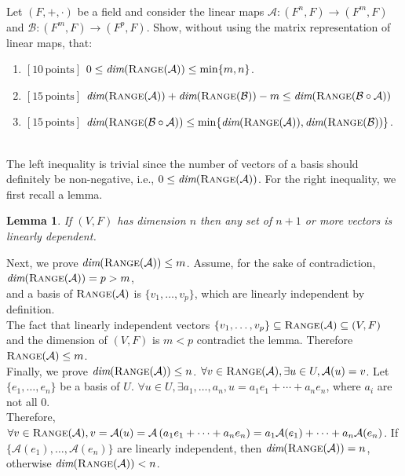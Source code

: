 \documentclass[a4paper,10.5pt]{article}
\def\dim{{\mbox{\em dim}}}
\def\range{{\mbox{\sc Range}}}
\newtheorem{lemma}{Lemma}
\newcommand{\A}{\mathcal{A}}
\begin{document}
\clearpage

\\
Let $(F, +, \cdot)$ be a field and consider the linear maps $\mathcal{A} : (F^n, F) \rightarrow (F^m, F)$ and  $\mathcal{B} : (F^m, F) \rightarrow (F^p, F)$. Show, without using the matrix representation of linear maps, that:

\begin{enumerate}
	\item {\bf$[10\, \text{points}]$} $0 \leq \dim(\range(\mathcal{A})) \leq \min\{m, n\}$.
	\item {\bf$[15\, \text{points}]$} $\dim(\range(\mathcal{A})) + \dim(\range(\mathcal{B})) - m \leq \dim(\range(\mathcal{B}\circ\mathcal{A}))$
	\item {\bf$[15\, \text{points}]$} $\dim(\range(\mathcal{B}\circ\mathcal{A})) \leq \min\{\dim(\range(\mathcal{A})),\dim(\range(\mathcal{B}))\}$. 
\end{enumerate}


 \\
The left inequality is trivial since the number of vectors of a basis should definitely be non-negative, i.e., $0 \leq \dim(\range(\mathcal{A}))$. For the right inequality, we first recall a lemma.
\begin{lemma}
	If $(V,F)$ has dimension $n$ then any set of $n+1$ or more vectors is linearly dependent.
\end{lemma}
Next, we prove $\dim(\range(\A)) \leq m$. Assume, for the sake of contradiction, $\dim(\range(\A)) = p > m$, \\
and a basis of $\range(\A)$ is $\{v_1,\dots,v_p\}$, which are linearly independent by definition. \\
The fact that linearly independent vectors $\{v_1,\dots,v_p\} \subseteq \range(\A) \subseteq (V,F)$ and the dimension of $(V,F)$ is $m<p$ contradict the lemma. Therefore $\range(\A) \leq m$. \\

Finally, we prove $\dim(\range(\A)) \leq n$. $\forall v \in \range(\A), \exists u \in U, \A(u)=v$. Let $\{e_1,\dots,e_n\}$ be a basis of $U$. $\forall u \in U, \exists a_1, \dots, a_n, u = a_1 e_1 + \cdots + a_n e_n$, where $a_i$ are not all $0$. \\
Therefore, $\forall v \in \range(\A), v = \A (u) = \A \left(a_1 e_1 + \cdots + a_n e_n\right) = a_1 \A(e_1) + \cdots + a_n \A(e_n)$. If $\{\A(e_1), \dots, \A(e_n)\}$ are linearly independent, then $\dim(\range(\A)) = n$, otherwise $\dim(\range(\A)) < n$. \\
\end{document}
